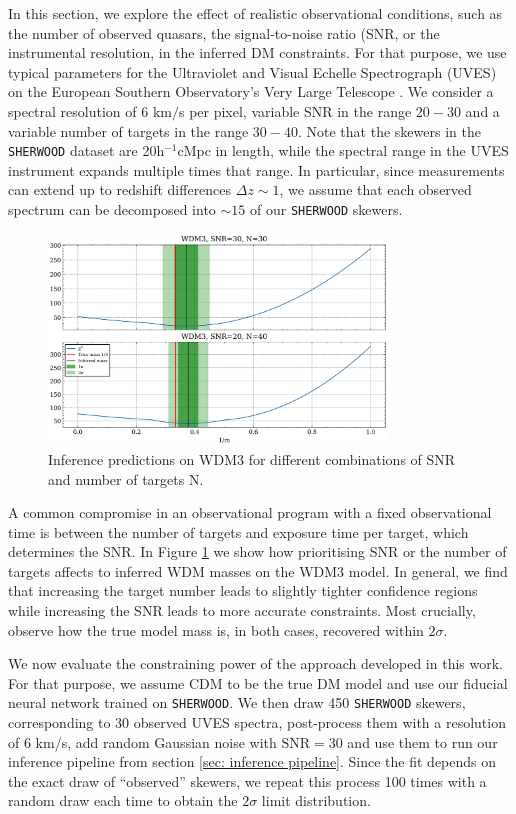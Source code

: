 In this section, we explore the effect of realistic observational conditions, such as the number of observed quasars, the signal-to-noise ratio (SNR, or the instrumental resolution, in the inferred DM constraints. For that purpose, we use typical parameters for the Ultraviolet and Visual Echelle Spectrograph (UVES) on the European Southern Observatory's Very Large Telescope \cite{Murphy_2018}. We consider a spectral resolution of $6$ km$/$s per pixel, variable SNR in the range $20-30$ and a variable number of targets in the range $30-40$. Note that the skewers in the \texttt{SHERWOOD} dataset are 20h$^{-1}$cMpc in length, while the spectral range in the UVES instrument expands multiple times that range. In particular, since measurements can extend up to redshift differences $\Delta z \sim 1$, we assume that each observed spectrum can be decomposed into $\sim 15$ of our \texttt{SHERWOOD} skewers.


\begin{figure}
    \centering
    \includegraphics[width=0.8\textwidth]{img/ML/SNR_vs_N.png}
    \caption{Inference predictions on WDM3 for different combinations of SNR and number of targets N.}
    \label{fig: inference snr vs n}
\end{figure}

A common compromise in an observational program with a fixed observational time is between the number of targets and exposure time per target, which determines the SNR. In Figure \ref{fig: inference snr vs n} we show how prioritising SNR or the number of targets affects to inferred WDM masses on the WDM3 model. In general, we find that increasing the target number leads to slightly tighter confidence regions while increasing the SNR leads to more accurate constraints. Most crucially, observe how the true model mass is, in both cases, recovered within $2\sigma$.

We now evaluate the constraining power of the approach developed in this work. For that purpose, we assume CDM to be the true DM model and use our fiducial neural network trained on \texttt{SHERWOOD}. We then draw 450 \texttt{SHERWOOD} skewers, corresponding to 30 observed UVES spectra, post-process them with a resolution of 6 km/s, add random Gaussian noise with $\text{SNR}=30$ and use them to run our inference pipeline from section \ref{sec: inference pipeline}. Since the fit depends on the exact draw of ``observed'' skewers, we repeat this process 100 times with a random draw each time to obtain the $2\sigma$ limit distribution.

